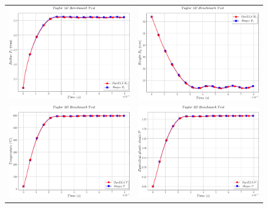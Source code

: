\begin{figure}[h]
\begin{centering}
\begin{tabular}{cc}
\includegraphics[width=0.45\columnwidth]{Figures/Samples/Impact/Taylor-3D_radius} & \includegraphics[width=0.45\columnwidth]{Figures/Samples/Impact/Taylor-3D_height}\tabularnewline
\includegraphics[width=0.45\columnwidth]{Figures/Samples/Impact/Taylor-3D_temperature} & \includegraphics[width=0.45\columnwidth]{Figures/Samples/Impact/Taylor-3D_plasticStrain}\tabularnewline

\end{tabular}
\end{centering}
\end{figure}
